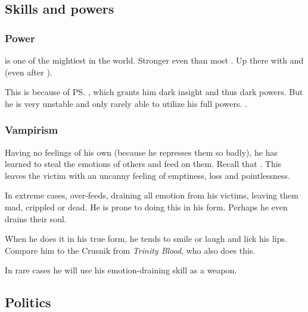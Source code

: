\subsection{Skills and powers}





\subsubsection{Power}
\Sithiyacaan{} is one of the mightiest \resphain{} in the world. 
Stronger even than most \satharioth. 
Up there with  and  (even after ). 

This is because of \ps{\Sithiyacaan}{} , which grants him dark insight and thus dark powers. 
But he is very unstable and only rarely able to utilize his full powers. 
. 





\subsubsection{Vampirism}
Having no feelings of his own (because he represses them so badly), he has learned to steal the emotions of others and feed on them. Recall that . This leaves the victim with an uncanny feeling of emptiness, loss and pointlessness. 

In extreme cases, \Sithiyacaan{} over-feeds, draining all emotion from his victims, leaving them mad, crippled or dead. He is prone to doing this in his  form. Perhaps he even drains their soul. 

When he does it in his true form, he tends to smile or laugh and lick his lips. Compare him to the Crusnik from \emph{Trinity Blood}, who also does this.

In rare cases he will use his emotion-draining skill as a weapon.









\subsection{Politics}






